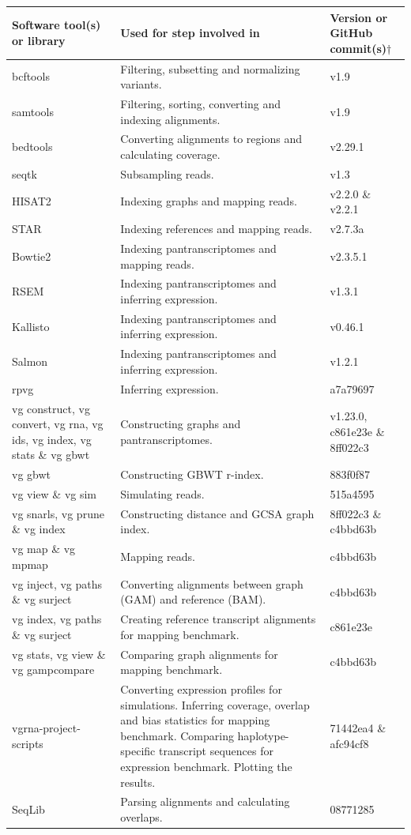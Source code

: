 \documentclass[11pt]{ucthesis}
\begin{document}
\begin{table}[H]
\footnotesize
\begin{tabular}{L{0.2\textwidth}| L{0.4\textwidth} | R{0.18\textwidth}}
\textbf{Software tool(s) or library} & \textbf{Used for step involved in} & \textbf{Version or GitHub commit(s)}$\dag$ \\
\midrule
bcftools & Filtering, subsetting and normalizing variants. & v1.9 \\
\midrule
samtools & Filtering, sorting, converting and indexing alignments. & v1.9 \\
\midrule
bedtools & Converting alignments to regions and calculating coverage. & v2.29.1 \\
\midrule
seqtk & Subsampling reads. & v1.3 \\
\midrule
HISAT2 & Indexing graphs and mapping reads. & v2.2.0 \& v2.2.1 \\
\midrule
STAR & Indexing references and mapping reads. & v2.7.3a \\
\midrule
Bowtie2 & Indexing pantranscriptomes and mapping reads. & v2.3.5.1 \\
\midrule
RSEM & Indexing pantranscriptomes and inferring expression. & v1.3.1 \\
\midrule
Kallisto & Indexing pantranscriptomes and inferring expression. & v0.46.1\\
\midrule
Salmon & Indexing pantranscriptomes and inferring expression. & v1.2.1 \\
\midrule
rpvg & Inferring expression. & a7a79697 \\
\midrule
vg construct, vg convert, vg rna, vg ids, vg index, vg stats \& vg gbwt  & Constructing graphs and pantranscriptomes. & v1.23.0, c861e23e \& 8ff022c3 \\
\midrule
vg gbwt & Constructing GBWT r-index. & 883f0f87 \\
\midrule
vg view \& vg sim & Simulating reads. & 515a4595 \\
\midrule
vg snarls, vg prune \& vg index & Constructing distance and GCSA graph index. & 8ff022c3 \& c4bbd63b \\
\midrule
vg map \& vg mpmap & Mapping reads. & c4bbd63b \\
\midrule
vg inject, vg paths \& vg surject & Converting alignments between graph (GAM) and reference (BAM). & c4bbd63b \\
\midrule
vg index, vg paths \& vg surject & Creating reference transcript alignments for mapping benchmark. & c861e23e \\
\midrule
vg stats, vg view \& vg gampcompare & Comparing graph alignments for mapping benchmark. & c4bbd63b \\
\midrule
vgrna-project-scripts & Converting expression profiles for simulations. Inferring coverage, overlap and bias statistics for mapping benchmark. Comparing haplotype-specific transcript sequences for expression benchmark. Plotting the results. & 71442ea4 \& afc94cf8 \\
\midrule
SeqLib & Parsing alignments and calculating overlaps. & 08771285
\end{tabular}


\end{table}
\end{document}
